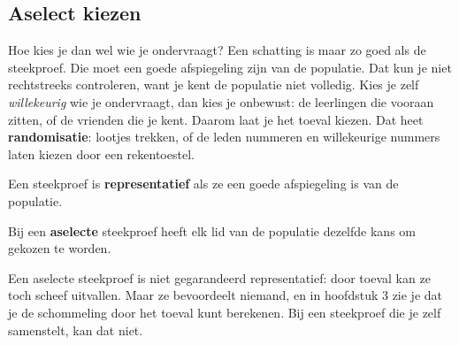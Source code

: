 
\begin{oefeningen}
\end{oefeningen}

\subsection{Aselect kiezen}

Hoe kies je dan wel wie je ondervraagt? Een schatting is maar zo goed als de steekproef. Die moet een goede afspiegeling zijn van de populatie. Dat kun je niet rechtstreeks controleren, want je kent de populatie niet volledig. Kies je zelf \textit{willekeurig} wie je ondervraagt, dan kies je onbewust: de leerlingen die vooraan zitten, of de vrienden die je kent. Daarom laat je het toeval kiezen. Dat heet \textbf{randomisatie}: lootjes trekken, of de leden nummeren en willekeurige nummers laten kiezen door een rekentoestel.

\begin{theorie}
Een steekproef is \textbf{\textcolor{accent}{representatief}} als ze een goede afspiegeling is van de populatie.

\vspace{1mm}
Bij een \textbf{\textcolor{accent}{aselecte}} steekproef heeft elk lid van de populatie dezelfde kans om gekozen te worden.
\end{theorie}

Een aselecte steekproef is niet gegarandeerd representatief: door toeval kan ze toch scheef uitvallen. Maar ze bevoordeelt niemand, en in hoofdstuk 3 zie je dat je de schommeling door het toeval kunt berekenen. Bij een steekproef die je zelf samenstelt, kan dat niet.

